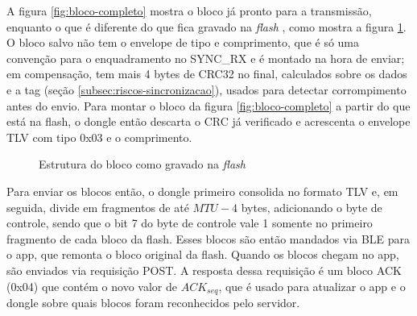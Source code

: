 \documentclass[
	12pt,
	article,			%
	oneside,
	a4paper,
	english,
	brazil				%
	]{abntex2}
\begin{document}
A figura \ref{fig:bloco-completo} mostra o bloco já pronto para a transmissão, enquanto o que é diferente do que fica gravado na \textit{flash} , como mostra a figura \ref{fig:bloco-flash}. O bloco salvo não tem o
envelope de tipo e comprimento, que é só uma convenção para o enquadramento no SYNC\_RX e é montado na hora de enviar; em compensação, tem mais 4 bytes de CRC32 no final, calculados sobre os dados e a tag
(seção \ref{subsec:riscos-sincronizacao}), usados para detectar corrompimento antes do envio. Para montar o bloco da figura \ref{fig:bloco-completo} a partir do que está na flash, o dongle então descarta
o CRC já verificado e acrescenta o envelope TLV com tipo 0x03 e o comprimento.

\begin{figure}[H]
	\centering
	\caption{Estrutura do bloco como gravado na \textit{flash}}
	\label{fig:bloco-flash}
\end{figure}

Para enviar os blocos então, o dongle primeiro consolida no formato TLV e, em seguida, divide em fragmentos de até $MTU - 4$ bytes, adicionando o byte de controle, sendo que o bit 7 do byte de controle vale 1 somente
no primeiro fragmento de cada bloco da flash. Esses blocos são então mandados via BLE para o app, que remonta o bloco original da flash. Quando os blocos chegam no app, são enviados via requisição POST. A resposta
dessa requisição é um bloco ACK (0x04) que contém o novo valor de $ACK_{seq}$, que é usado para atualizar o app e o dongle sobre quais blocos foram reconhecidos pelo servidor.
\end{document}
